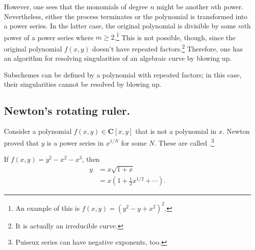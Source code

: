 \documentclass [11 pt, oneside] {article}
\begin{document}
However, one sees that the monomials of degree $n$ might be another $n$th power. Nevertheless, either the process terminates or the polynomial is transformed into a power series. In the latter case, the original polynomial is divisible by some $m$th power of a power series where $m\ge 2$.\footnote{An example of this is $f(x,y)= (y^2-y+x^2)^2$.} This is not possible, though, since the original polynomial $f(x,y)$ doesn't have repeated factors.\footnote{It is actually an irreducible curve.} Therefore, one has an algorithm for resolving singularities of an algebraic curve by blowing up.

\begin{remark}
	Subschemes can be defined by a polynomial with repeated factors; in this case, their singularities cannot be resolved by blowing up.
\end{remark}

\subsection{Newton's rotating ruler.}
Consider a polynomial $f(x,y)\in  \mathbf{C}[x,y]$ that is not a polynomial in $x$. Newton proved that $y$ is a power series in $x^{1/N}$ for some $N$. These are called .\footnote{Puiseux series can have negative exponents, too.}

\begin{example}[ ]\label{}\text{}
If $f(x,y) = y^2-x^2 -x^3$, then
\begin{align*}
	y &= x\sqrt{1+x}\\
	  &= x \left( 1 + \frac{1}{2}x^{1/2} + \cdots \right). 
\end{align*}
\end{example}
\end{document}
